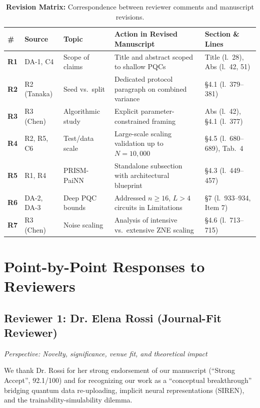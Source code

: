 \documentclass[10pt,letterpaper]{article}
\begin{document}
\vspace{0.8em}
\begin{table}[h!]
\centering
\small
\setlength{\tabcolsep}{4pt}
\begin{tabular}{lllp{4.2cm}l}
\toprule
\textbf{\#} & \textbf{Source} & \textbf{Topic} & \textbf{Action in Revised Manuscript} & \textbf{Section \& Lines} \\
\midrule
\textbf{R1} & DA-1, C4 & Scope of claims & Title and abstract scoped to shallow PQCs & Title (l.~28), Abs (l.~42, 51) \\
\textbf{R2} & R2 (Tanaka) & Seed vs.\ split & Dedicated protocol paragraph on combined variance & §4.1 (l.~379--381) \\
\textbf{R3} & R3 (Chen) & Algorithmic study & Explicit parameter-constrained framing & Abs (l.~42), §4.1 (l.~377) \\
\textbf{R4} & R2, R5, C6 & Test/data scale & Large-scale scaling validation up to $N=10{,}000$ & §4.5 (l.~680--689), Tab.~4 \\
\textbf{R5} & R1, R4 & PRISM-PaiNN & Standalone subsection with architectural blueprint & §4.3 (l.~449--457) \\
\textbf{R6} & DA-2, DA-3 & Deep PQC bounds & Addressed $n \ge 16$, $L > 4$ circuits in Limitations & §7 (l.~933--934, Item 7) \\
\textbf{R7} & R3 (Chen) & Noise scaling & Analysis of intensive vs.\ extensive ZNE scaling & §4.6 (l.~713--715) \\
\bottomrule
\end{tabular}
\caption{\textbf{Revision Matrix:} Correspondence between reviewer comments and manuscript revisions.}
\end{table}

\newpage

\section*{Point-by-Point Responses to Reviewers}

\subsection*{Reviewer 1: Dr. Elena Rossi (Journal-Fit Reviewer)}
\textit{Perspective: Novelty, significance, venue fit, and theoretical impact}

We thank Dr. Rossi for her strong endorsement of our manuscript (``Strong Accept'', 92.1/100) and for recognizing our work as a ``conceptual breakthrough'' bridging quantum data re-uploading, implicit neural representations (SIREN), and the trainability-simulability dilemma.
\end{document}

